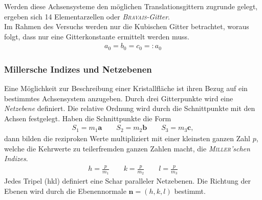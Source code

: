 \documentclass[a4paper,twoside,final]{article}
\begin{document}
Werden diese Achsensysteme den möglichen Translationsgittern zugrunde gelegt, ergeben sich 14 Elementarzellen oder \textit{\textsc{Bravais}-Gitter}.\\
Im Rahmen des Versuchs werden nur die Kubischen Gitter betrachtet, woraus folgt, dass nur eine Gitterkonstante ermittelt werden muss.
\begin{align}
  a_0 = b_0 = c_0 =: a_0
\end{align}

\subsubsection{Millersche Indizes und Netzebenen}
Eine Möglichkeit zur Beschreibung einer Kristallfläche ist ihren Bezug auf ein bestimmtes Achsensystem anzugeben. Durch drei Gitterpunkte wird eine \textit{Netzebene} definiert. Die relative Ordnung wird durch die Schnittpunkte mit den Achsen festgelegt. Haben die Schnittpunkte die Form
\begin{align}
  S_1 = m_1 \bm{a} \qquad S_2 = m_2 \bm{b} \qquad S_3 = m_3 \bm{c},
\end{align}
dann bilden die reziproken Werte multipliziert mit einer kleinsten ganzen Zahl $p$, welche die Kehrwerte zu teilerfremden ganzen Zahlen macht, die \textit{\textsc{Miller}'schen Indizes}.
\begin{align}
  h = \frac{p}{m_1} \qquad k = \frac{p}{m_2} \qquad l = \frac{p}{m_3}
\end{align}
Jedes Tripel (hkl) definiert eine Schar paralleler Netzebenen. Die Richtung der Ebenen wird durch die Ebenennormale $\bm{n} = (h,k,l)$ bestimmt.
\end{document}
